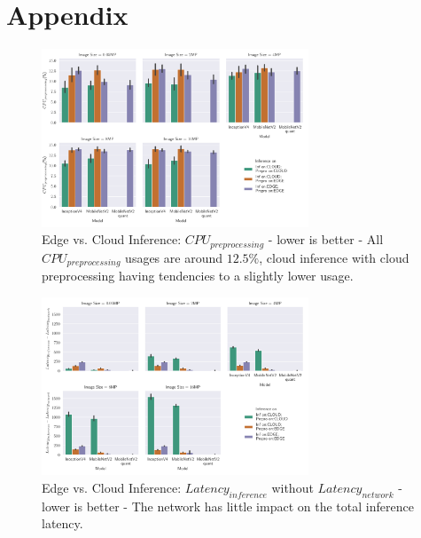 \appendix
\chapter{Appendix}
\begin{figure}[!htb]
\centering
\includegraphics[width=0.71\textwidth]{./Bilder/single_plots/edge_vs_cloud_plots/Edge_vs_Cloud_Inference_Preprocessing_CPU.pdf}
\caption[Edge vs. Cloud Inference: $CPU_{preprocessing}$ - lower is better]{Edge vs. Cloud Inference: $CPU_{preprocessing}$ - lower is better - 
All $CPU_{preprocessing}$ usages are around $12.5\%$, cloud inference with cloud preprocessing having tendencies to a slightly lower usage.}
\label{fig:CloudEdgePreproCPU}
\end{figure}

\begin{figure}[!htb]
\centering
\includegraphics[width=0.71\textwidth]{./Bilder/single_plots/edge_vs_cloud_plots/Edge_vs_Cloud_Inference_Inference_Latencies_WITHOUT_NETWORK.pdf}
\caption{Edge vs. Cloud Inference: $Latency_{inference}$ without $Latency_{network}$ - lower is better - The network has little impact on the total inference latency.}
\label{fig:CloudEdgeInfLatWONetwork}
\end{figure}








